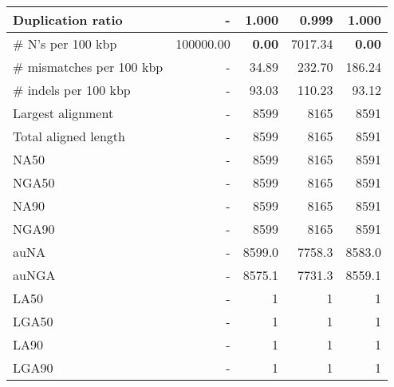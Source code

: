 \documentclass[12pt,a4paper]{article}
\begin{document}
\begin{table}[ht]
\begin{center}
\begin{tabular}{|l*{4}{|r}|}
Duplication ratio & - & 1.000 & 0.999 & 1.000 \\ \hline
\# N's per 100 kbp & 100000.00 & {\bf 0.00} & 7017.34 & {\bf 0.00} \\ \hline
\# mismatches per 100 kbp & - & 34.89 & 232.70 & 186.24 \\ \hline
\# indels per 100 kbp & - & 93.03 & 110.23 & 93.12 \\ \hline
Largest alignment & - & 8599 & 8165 & 8591 \\ \hline
Total aligned length & - & 8599 & 8165 & 8591 \\ \hline
NA50 & - & 8599 & 8165 & 8591 \\ \hline
NGA50 & - & 8599 & 8165 & 8591 \\ \hline
NA90 & - & 8599 & 8165 & 8591 \\ \hline
NGA90 & - & 8599 & 8165 & 8591 \\ \hline
auNA & - & 8599.0 & 7758.3 & 8583.0 \\ \hline
auNGA & - & 8575.1 & 7731.3 & 8559.1 \\ \hline
LA50 & - & 1 & 1 & 1 \\ \hline
LGA50 & - & 1 & 1 & 1 \\ \hline
LA90 & - & 1 & 1 & 1 \\ \hline
LGA90 & - & 1 & 1 & 1 \\ \hline
\end{tabular}
\end{center}
\end{table}
\end{document}
